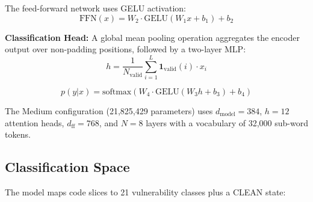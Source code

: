 \documentclass[conference,compsoc]{IEEEtran}
\begin{document}
The feed-forward network uses GELU activation:
\begin{equation}
\text{FFN}(x) = W_2 \cdot \text{GELU}(W_1 x + b_1) + b_2
\end{equation}

\textbf{Classification Head:} A global mean pooling operation aggregates the encoder output over non-padding positions, followed by a two-layer MLP:
\begin{equation}
h = \frac{1}{N_{\text{valid}}} \sum_{i=1}^{L} \mathbf{1}_{\text{valid}}(i) \cdot x_i
\end{equation}

\begin{equation}
p(y|x) = \text{softmax}(W_4 \cdot \text{GELU}(W_3 h + b_3) + b_4)
\end{equation}

The Medium configuration (21,825,429 parameters) uses $d_{\text{model}} = 384$, $h = 12$ attention heads, $d_{\text{ff}} = 768$, and $N = 8$ layers with a vocabulary of 32,000 sub-word tokens.

\subsection{Classification Space}

The model maps code slices to 21 vulnerability classes plus a CLEAN state:
\end{document}
